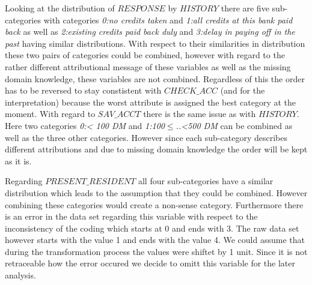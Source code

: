 Looking at the distribution of $RESPONSE$ by $HISTORY$ there are five sub-categories with categories \textit{0:no credits taken} and \textit{1:all credits at this bank paid back} as well as \textit{2:existing credits paid back duly} and \textit{3:delay in paying off in the past} having similar distributions. With respect to their similarities in distribution these two pairs of categories could be combined, however with regard to the rather different attributional message of these variables as well as the missing domain knowledge, these variables are not combined. Regardless of this the order has to be reversed to stay constistent with $CHECK\_ACC$ (and for the interpretation) because the worst attribute is assigned the best category at the moment. With regard to $SAV\_ACCT$ there is the same issue as with $HISTORY$. Here two categories \textit{0:< 100 DM} and \textit{1:100$\leq$..<500 DM} can be combined as well as the three other categories. However since each sub-category describes different attributions and due to missing domain knowledge the order will be kept as it is. 

Regarding $PRESENT\_RESIDENT$ all four sub-categories have a similar distribution which leads to the assumption that they could be combined. However combining these categories would create a non-sense category. Furthermore there is an error in the data set regarding this variable with respect to the inconsistency of the coding which starts at 0 and ends with 3. The raw data set however starts with the value 1 and ends with the value 4. We could assume that during the transformation process the values were shiftet by 1 unit. Since it is not retraceable how the error occured we decide to omitt this variable for the later analysis.

